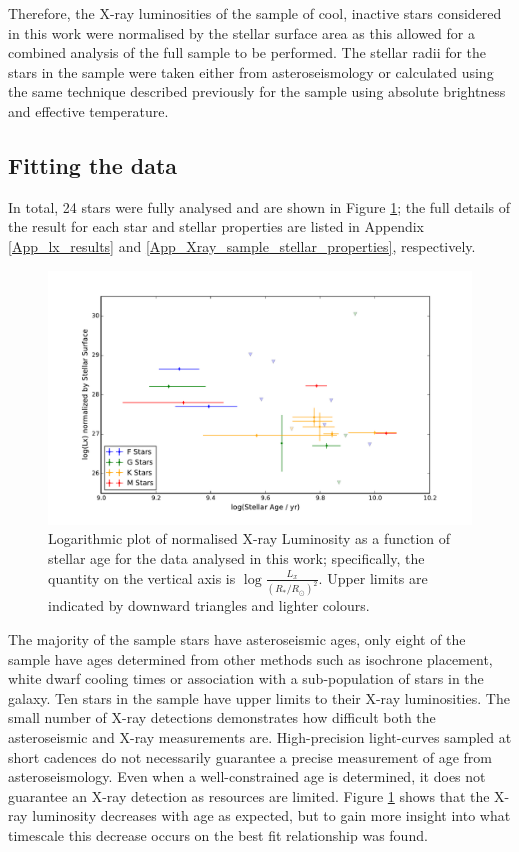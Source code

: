 Therefore, the X-ray luminosities of the sample of cool, inactive stars considered in this work were normalised by the stellar surface area as this allowed for a combined analysis of the full sample to be performed. The stellar radii for the stars in the sample were taken either from asteroseismology or calculated using the same technique described previously for the \citet{Schmitt_Liefke_2004} sample using absolute brightness and effective temperature.

\subsection{Fitting the data}
In total, 24 stars were fully analysed and are shown in Figure \ref{fig:Xray_sample}; the full details of the result for each star and stellar properties are listed in Appendix \ref{App_lx_results} and \ref{App_Xray_sample_stellar_properties}, respectively.

\begin{figure}
    \centering
    \includegraphics[scale=0.55]{Figures/3-Xray_age/xray_results.pdf}
    \caption[Plot of normalised X-ray luminosity as a function of age]{Logarithmic plot of normalised X-ray Luminosity as a function of stellar age for the data analysed in this work; specifically, the quantity on the vertical axis is $\log\frac{L_{x}}{(R_\ast/R_\odot)^{2}}$. Upper limits are indicated by downward triangles and lighter colours.}
    \label{fig:Xray_sample}
\end{figure}

The majority of the sample stars have asteroseismic ages, only eight of the sample have ages determined from other methods such as isochrone placement, white dwarf cooling times or association with a sub-population of stars in the galaxy. Ten stars in the sample have upper limits to their X-ray luminosities. The small number of X-ray detections demonstrates how difficult both the asteroseismic and X-ray measurements are. High-precision light-curves sampled at short cadences do not necessarily guarantee a precise measurement of age from asteroseismology. Even when a well-constrained age is determined, it does not guarantee an X-ray detection as resources are limited. Figure \ref{fig:Xray_sample} shows that the X-ray luminosity decreases with age as expected, but to gain more insight into what timescale this decrease occurs on the best fit relationship was found.

